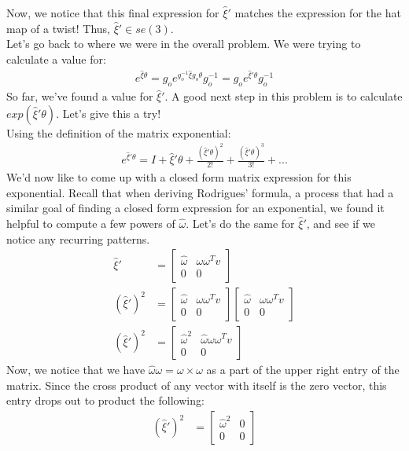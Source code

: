 \documentclass[oneside]{book}
\begin{document}
Now, we notice that this final expression for $\hat\xi'$ matches the expression for the hat map of a twist! Thus, $\hat\xi' \in se(3)$.\\
Let's go back to where we were in the overall problem. We were trying to calculate a value for:
\begin{align}
    e^{\hat\xi\theta} = g_o e^{g_o^{-1} \hat\xi g_o\theta}g_o^{-1} =  g_o e^{\hat\xi'\theta}g_o^{-1}
\end{align}
So far, we've found a value for $\hat\xi '$. A good next step in this problem is to calculate $exp(\hat\xi' \theta)$. Let's give this a try!\\
Using the definition of the matrix exponential:
\begin{align}
    e^{\hat\xi'\theta} = I + \hat\xi'\theta + \frac{(\hat\xi'\theta)^2}{2!} + \frac{(\hat\xi'\theta)^3}{3!} + ...
\end{align}
We'd now like to come up with a closed form matrix expression for this exponential. Recall that when deriving Rodrigues' formula, a process that had a similar goal of finding a closed form expression for an exponential, we found it helpful to compute a few powers of $\hat\omega$. Let's do the same for $\hat\xi'$, and see if we notice any recurring patterns.
\begin{align}
    \hat\xi' &= \begin{bmatrix}
    \hat\omega & \omega\omega^Tv\\
    0 & 0
    \end{bmatrix}\\
    (\hat\xi')^2 &= 
    \begin{bmatrix}
    \hat\omega & \omega\omega^Tv\\
    0 & 0
    \end{bmatrix}
    \begin{bmatrix}
    \hat\omega & \omega\omega^Tv\\
    0 & 0
    \end{bmatrix}\\
   (\hat\xi')^2 &= 
    \begin{bmatrix}
    \hat\omega^2 & \hat\omega\omega\omega^Tv\\
    0 & 0
    \end{bmatrix}
\end{align}
Now, we notice that we have $\hat\omega \omega = \omega \times \omega$ as a part of the upper right entry of the matrix. Since the cross product of any vector with itself is the zero vector, this entry drops out to product the following:
\begin{align}
    (\hat\xi')^2 &= 
    \begin{bmatrix}
    \hat\omega^2 & 0\\
    0 & 0
    \end{bmatrix}
\end{align}
\end{document}
